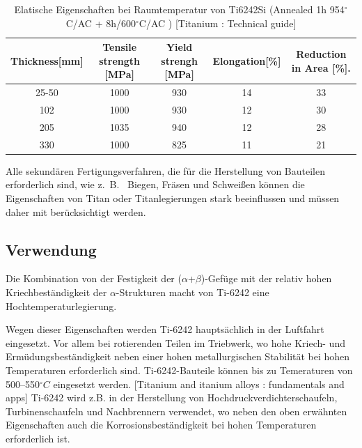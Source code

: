 	\begin{table}[H]
		\small
		\tabcolsep=0.09cm
		\centering	
		\begin{tabular}{|c |c |c|c |c|}
			\hline
			\centering
			Thickness[mm] & Tensile strength [MPa] & Yield strengh [MPa] & Elongation[\%]& Reduction in Area [\%]. \\
			\hline
			25-50&1000&930&14&33\\
			102&1000&930&12&30\\
			205&1035&940&12&28\\
			330&1000&825&11&21\\
			
			\hline
		\end{tabular}
		\caption{Elatische Eigenschaften bei Raumtemperatur von Ti6242Si (Annealed 1h 954$^\circ$C/AC + 8h/600$^\circ$C/AC )  [Titanium : Technical guide]}
		\label{Mecprop}
	\end{table}
	
	
	Alle sekundären Fertigungsverfahren, die für die Herstellung von Bauteilen erforderlich sind, wie z.~B.~ Biegen, Fräsen und Schweißen können die  Eigenschaften von Titan oder Titanlegierungen stark beeinflussen und müssen daher mit berücksichtigt werden.
	
	
	
	
	\subsection{Verwendung}
	
	
	Die Kombination von der Festigkeit der ($\alpha$+$\beta$)-Gefüge mit der relativ hohen Kriechbeständigkeit der $\alpha$-Strukturen macht von Ti-6242 eine Hochtemperaturlegierung. 
	
	Wegen dieser Eigenschaften werden Ti-6242 hauptsächlich in der Luftfahrt eingesetzt. Vor allem bei rotierenden Teilen im Triebwerk, wo hohe Kriech- und Ermüdungsbeständigkeit neben einer hohen metallurgischen Stabilität bei hohen Temperaturen erforderlich sind. 
	Ti-6242-Bauteile können bis zu Temeraturen von  500--550$^\circ C$ eingesetzt werden. [Titanium and itanium alloys : fundamentals and apps]
	Ti-6242 wird z.B. in der Herstellung von Hochdruckverdichterschaufeln, Turbinenschaufeln und Nachbrennern verwendet, wo neben den oben erwähnten Eigenschaften auch die Korrosionsbeständigkeit bei hohen Temperaturen erforderlich ist. 
	
	
	
	
	
